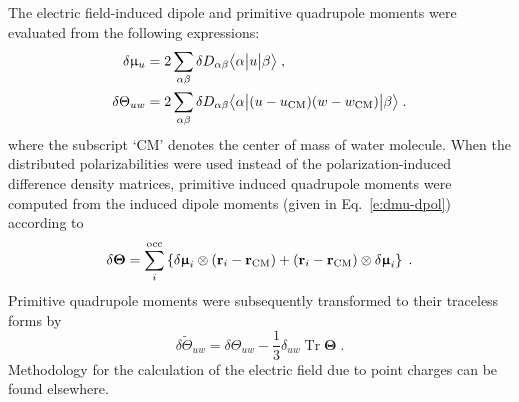 \documentclass[aip,amsmath,amssymb,reprint,floatfix]{revtex4-1}
\newcommand{\tbraket}[3]{\ensuremath{\bigl\langle {#1} \bigl\lvert {#2} \bigl\lvert {#3} \bigr\rangle}}
\newcommand{\BM}[1]{\bm{#1}}
\DeclareMathOperator{\Tr}{Tr}
\begin{document}
The electric field\hyp{}induced dipole and primitive quadrupole moments were evaluated from the following expressions:
%
\begin{subequations}\label{e:dmult}
  \begin{align}
   \delta \upmu_{u}   &= 2\sum_{\alpha\beta} \delta D_{\alpha\beta} \tbraket{\alpha}{u}{\beta}  \;,\\
   \delta \Theta_{uw} &= 2\sum_{\alpha\beta} \delta D_{\alpha\beta} \tbraket{\alpha}{(u-u_{\rm CM})(w-w_{\rm CM})}{\beta} \;. 
  \end{align}
\end{subequations}
%
where the subscript `CM' denotes the center of mass of water molecule.
When the distributed polarizabilities were used instead of the polarization\hyp{}induced 
difference density matrices, primitive induced quadrupole moments were computed from
the induced dipole moments (given in Eq.~\eqref{e:dmu-dpol}) according to
%
\begin{equation}
  \delta {\BM \Theta} = \sum_i^{\rm occ} 
   \left\{ 
       \delta {\BM \upmu}_i \otimes \left( {\bf r}_i - {\bf r}_{\rm CM} \right) 
      + \left( {\bf r}_i - {\bf r}_{\rm CM} \right) \otimes \delta {\BM \upmu}_i
   \right\} \;.
\end{equation}
%
Primitive quadrupole moments were subsequently transformed to their traceless forms by
%
\begin{equation}
  \delta \widetilde{\Theta}_{uw} = \delta \Theta_{uw} - \frac{1}{3} \delta_{uw} \Tr{\BM\Theta} \;.
\end{equation}
%
Methodology for the calculation of the electric field due to point charges
can be found elsewhere.\cite{Blasiak.Cho.JCP.2014}
\end{document}
